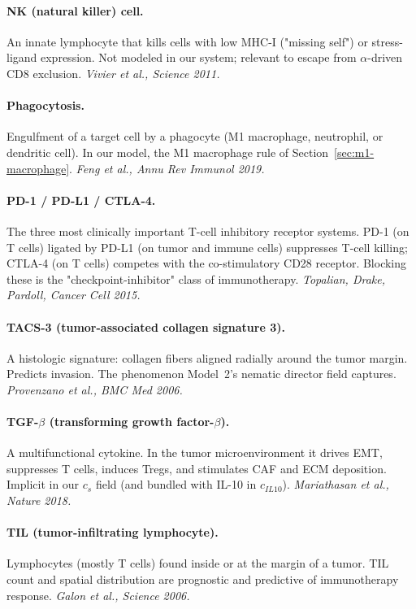 \documentclass[11pt,letterpaper]{article}
\begin{document}
\paragraph{NK (natural killer) cell.}
An innate lymphocyte that kills cells with low MHC-I ("missing self")
or stress-ligand expression. Not modeled in our system; relevant to
escape from $\alpha$-driven CD8 exclusion. \emph{Vivier et al.,
Science 2011.}

\paragraph{Phagocytosis.}
Engulfment of a target cell by a phagocyte (M1 macrophage, neutrophil,
or dendritic cell). In our model, the M1 macrophage rule of
Section~\ref{sec:m1-macrophage}. \emph{Feng et al., Annu Rev Immunol 2019.}

\paragraph{PD-1 / PD-L1 / CTLA-4.}
The three most clinically important T-cell inhibitory receptor systems.
PD-1 (on T cells) ligated by PD-L1 (on tumor and immune cells)
suppresses T-cell killing; CTLA-4 (on T cells) competes with the
co-stimulatory CD28 receptor. Blocking these is the
"checkpoint-inhibitor" class of immunotherapy. \emph{Topalian, Drake,
Pardoll, Cancer Cell 2015.}

\paragraph{TACS-3 (tumor-associated collagen signature 3).}
A histologic signature: collagen fibers aligned radially around the
tumor margin. Predicts invasion. The phenomenon Model~2's nematic
director field captures. \emph{Provenzano et al., BMC Med 2006.}

\paragraph{TGF-$\beta$ (transforming growth factor-$\beta$).}
A multifunctional cytokine. In the tumor microenvironment it drives
EMT, suppresses T cells, induces Tregs, and stimulates CAF and ECM
deposition. Implicit in our $c_s$ field (and bundled with IL-10 in
$c_{IL10}$). \emph{Mariathasan et al., Nature 2018.}

\paragraph{TIL (tumor-infiltrating lymphocyte).}
Lymphocytes (mostly T cells) found inside or at the margin of a tumor.
TIL count and spatial distribution are prognostic and predictive of
immunotherapy response. \emph{Galon et al., Science 2006.}
\end{document}
